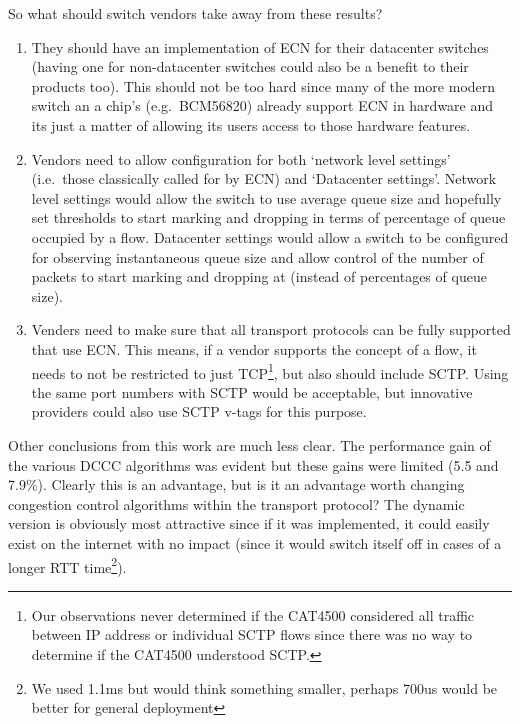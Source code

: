 \documentclass[12pt]{article}
\begin{document}
So what should switch vendors take away from these results?

\begin{enumerate}

\item They should have an implementation of ECN for their datacenter switches (having one
for non-datacenter switches could also be a benefit to their products too). This
should not be too hard since many of the more modern switch an a chip's (e.g.~BCM56820)
already support ECN in hardware and its just a matter of allowing its users access to those
hardware features.

\item Vendors need to allow configuration for both `network level settings' (i.e.~those classically called
for by ECN) and `Datacenter settings'. Network level settings would allow the switch to use average queue
size and hopefully set thresholds to start marking and dropping in terms of percentage of queue occupied by
a flow. Datacenter settings would allow a switch to be configured for observing instantaneous queue size
and allow control of the number of packets to start marking and dropping at (instead of percentages of
queue size).

\item Venders need to make sure that all transport protocols can be fully supported that use ECN. This
means, if a vendor supports the concept of a flow, it needs to not be restricted to just TCP\footnote{Our observations
never determined if the CAT4500 considered all traffic between IP address or individual SCTP flows since there was
no way to determine if the CAT4500 understood SCTP.}, but also should include SCTP. Using the same port
numbers with SCTP would be acceptable, but innovative providers could also use SCTP v-tags for this purpose.

\end{enumerate}

Other conclusions from this work are much less clear. The performance gain of the various DCCC algorithms
was evident but these gains were limited (5.5 and 7.9\%). Clearly this is an advantage, but is it an advantage
worth changing congestion control algorithms within the transport protocol? The dynamic version is obviously most
attractive since if it was implemented, it could easily exist on the internet with no impact (since it would switch itself
off in cases of a longer RTT time\footnote{We used 1.1ms but would think something smaller, perhaps 700us would
be better for general deployment}). 
\end{document}
